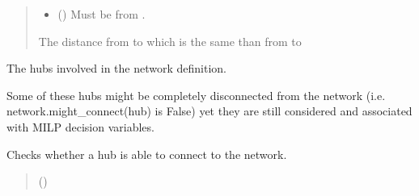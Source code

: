 \documentclass[letterpaper,10pt,english]{sphinxmanual}
\begin{document}
\begin{fulllineitems}
\begin{fulllineitems}
\begin{quote}
\begin{description}
\begin{itemize}
\item {} 
\sphinxAtStartPar
{} ({\hyperref[\detokenize{generated/tamos.Hub:tamos.Hub}]{}}) \textendash{} Must be from .

\end{itemize}

\sphinxAtStartPar
The distance from  to  which is the same than from  to 

\end{description}\end{quote}

\end{fulllineitems}


\begin{fulllineitems}
\label{\detokenize{generated/tamos.network.NonThermalNetwork:tamos.network.NonThermalNetwork.hubs}}
\pysigstartsignatures
{}
\pysigstopsignatures
\sphinxAtStartPar
The hubs involved in the network definition.

\sphinxAtStartPar
Some of these hubs might be completely disconnected from the network
(i.e. network.might\_connect(hub) is False) yet they are still considered and associated with MILP decision variables.

\end{fulllineitems}


\begin{fulllineitems}
\label{\detokenize{generated/tamos.network.NonThermalNetwork:tamos.network.NonThermalNetwork.might_connect}}
\pysigstartsignatures
{}
\pysigstopsignatures
\sphinxAtStartPar
Checks whether a hub is able to connect to the network.
\begin{quote}\begin{description}
\sphinxAtStartPar
{} ({\hyperref[\detokenize{generated/tamos.Hub:tamos.Hub}]{}}) \textendash{} 


\end{description}
\end{quote}
\end{fulllineitems}
\end{fulllineitems}
\end{document}
